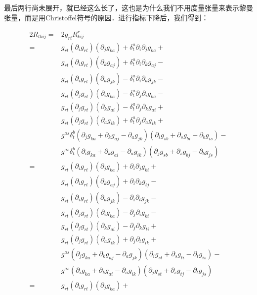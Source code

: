 最后两行尚未展开，就已经这么长了，这也是为什么我们不用度量张量来表示黎曼张量，而是用Christoffel符号的原因．进行指标下降后，我们得到：

\begin{equation}\label{RicciC_eq2}
\begin{aligned}
2R_{tkij}=&2g_{rt}R^r_{kij}\\
=&g_{rt}(\partial_ig_{rt})(\partial_jg_{ka})+\delta^a_t\partial_i\partial_jg_{ka}+\\
&g_{rt}(\partial_ig_{rt})(\partial_kg_{aj})+\delta^a_t\partial_i\partial_kg_{aj}-\\
&g_{rt}(\partial_ig_{rt})(\partial_ag_{jk})-\delta^a_t\partial_i\partial_ag_{jk}-\\%
&g_{rt}(\partial_jg_{rt})(\partial_ig_{ka})-\delta^a_t\partial_j\partial_ig_{ka}-\\
&g_{rt}(\partial_jg_{rt})(\partial_kg_{ai})-\delta^a_t\partial_j\partial_kg_{ai}+\\
&g_{rt}(\partial_jg_{rt})(\partial_ag_{ik})+\delta^a_t\partial_j\partial_ag_{ik}+\\%
&g^{as}\delta^b_t(\partial_jg_{ka}+\partial_kg_{aj}-\partial_ag_{jk})(\partial_ig_{sb}+\partial_sg_{bi}-\partial_bg_{is})-\\
&g^{as}\delta^b_t(\partial_ig_{ka}+\partial_kg_{ai}-\partial_ag_{ik})(\partial_jg_{sb}+\partial_sg_{bj}-\partial_bg_{js})\\
=&g_{rt}(\partial_ig_{rt})(\partial_jg_{ka})+\partial_i\partial_jg_{kt}+\\
&g_{rt}(\partial_ig_{rt})(\partial_kg_{aj})+\partial_i\partial_kg_{tj}-\\
&g_{rt}(\partial_ig_{rt})(\partial_ag_{jk})-\partial_i\partial_tg_{jk}-\\%
&g_{rt}(\partial_jg_{rt})(\partial_ig_{ka})-\partial_j\partial_ig_{kt}-\\
&g_{rt}(\partial_jg_{rt})(\partial_kg_{ai})-\partial_j\partial_kg_{ti}+\\
&g_{rt}(\partial_jg_{rt})(\partial_ag_{ik})+\partial_j\partial_tg_{ik}+\\%
&g^{as}(\partial_jg_{ka}+\partial_kg_{aj}-\partial_ag_{jk})(\partial_ig_{st}+\partial_sg_{ti}-\partial_tg_{is})-\\
&g^{as}(\partial_ig_{ka}+\partial_kg_{ai}-\partial_ag_{ik})(\partial_jg_{st}+\partial_sg_{tj}-\partial_tg_{js})\\
=&g_{rt}(\partial_ig_{rt})(\partial_jg_{ka})+\\

\end{aligned}
\end{equation}

